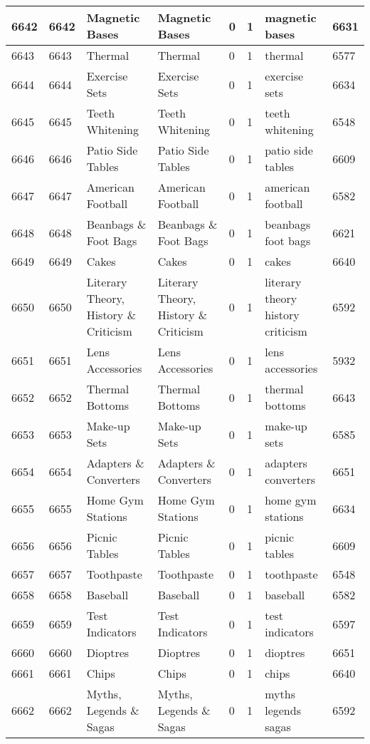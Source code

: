 \begin{longtable}{|l|l|l|l|l|l|l|l|}
6642 & 6642 & Magnetic Bases & Magnetic Bases & 0 & 1 & magnetic bases & 6631 \\ \hline 
6643 & 6643 & Thermal & Thermal & 0 & 1 & thermal & 6577 \\ \hline 
6644 & 6644 & Exercise Sets & Exercise Sets & 0 & 1 & exercise sets & 6634 \\ \hline 
6645 & 6645 & Teeth Whitening & Teeth Whitening & 0 & 1 & teeth whitening & 6548 \\ \hline 
6646 & 6646 & Patio Side Tables & Patio Side Tables & 0 & 1 & patio side tables & 6609 \\ \hline 
6647 & 6647 & American Football & American Football & 0 & 1 & american football & 6582 \\ \hline 
6648 & 6648 & Beanbags \& Foot Bags & Beanbags \& Foot Bags & 0 & 1 & beanbags foot bags & 6621 \\ \hline 
6649 & 6649 & Cakes & Cakes & 0 & 1 & cakes & 6640 \\ \hline 
6650 & 6650 & Literary Theory, History \& Criticism & Literary Theory, History \& Criticism & 0 & 1 & literary theory history criticism & 6592 \\ \hline 
6651 & 6651 & Lens Accessories & Lens Accessories & 0 & 1 & lens accessories & 5932 \\ \hline 
6652 & 6652 & Thermal Bottoms & Thermal Bottoms & 0 & 1 & thermal bottoms & 6643 \\ \hline 
6653 & 6653 & Make-up Sets & Make-up Sets & 0 & 1 & make-up sets & 6585 \\ \hline 
6654 & 6654 & Adapters \& Converters & Adapters \& Converters & 0 & 1 & adapters converters & 6651 \\ \hline 
6655 & 6655 & Home Gym Stations & Home Gym Stations & 0 & 1 & home gym stations & 6634 \\ \hline 
6656 & 6656 & Picnic Tables & Picnic Tables & 0 & 1 & picnic tables & 6609 \\ \hline 
6657 & 6657 & Toothpaste & Toothpaste & 0 & 1 & toothpaste & 6548 \\ \hline 
6658 & 6658 & Baseball & Baseball & 0 & 1 & baseball & 6582 \\ \hline 
6659 & 6659 & Test Indicators & Test Indicators & 0 & 1 & test indicators & 6597 \\ \hline 
6660 & 6660 & Dioptres & Dioptres & 0 & 1 & dioptres & 6651 \\ \hline 
6661 & 6661 & Chips & Chips & 0 & 1 & chips & 6640 \\ \hline 
6662 & 6662 & Myths, Legends \& Sagas & Myths, Legends \& Sagas & 0 & 1 & myths legends sagas & 6592 \\ \hline 

\end{longtable}
